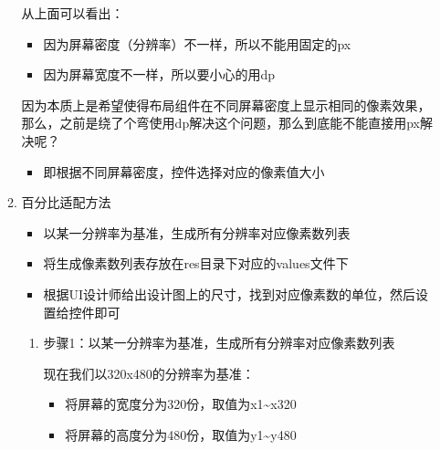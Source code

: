 \documentclass[9pt, b5paper]{article}
\begin{document}
\begin{enumerate}
\begin{enumerate}
从上面可以看出：
\begin{itemize}
\item 因为屏幕密度（分辨率）不一样，所以不能用固定的px
\item 因为屏幕宽度不一样，所以要小心的用dp
\end{itemize}

因为本质上是希望使得布局组件在不同屏幕密度上显示相同的像素效果，那么，之前是绕了个弯使用dp解决这个问题，那么到底能不能直接用px解决呢？
\begin{itemize}
\item 即根据不同屏幕密度，控件选择对应的像素值大小
\end{itemize}

\item 百分比适配方法
\label{sec-1-6-2-1-2}
\begin{itemize}
\item 以某一分辨率为基准，生成所有分辨率对应像素数列表
\item 将生成像素数列表存放在res目录下对应的values文件下
\item 根据UI设计师给出设计图上的尺寸，找到对应像素数的单位，然后设置给控件即可
\end{itemize}

\begin{enumerate}
\item 步骤1：以某一分辨率为基准，生成所有分辨率对应像素数列表
\label{sec-1-6-2-1-2-1}

现在我们以320x480的分辨率为基准：
\begin{itemize}
\item 将屏幕的宽度分为320份，取值为x1\textasciitilde{}x320
\item 将屏幕的高度分为480份，取值为y1\textasciitilde{}y480
\end{itemize}


\end{enumerate}
\end{enumerate}
\end{enumerate}
\end{document}

